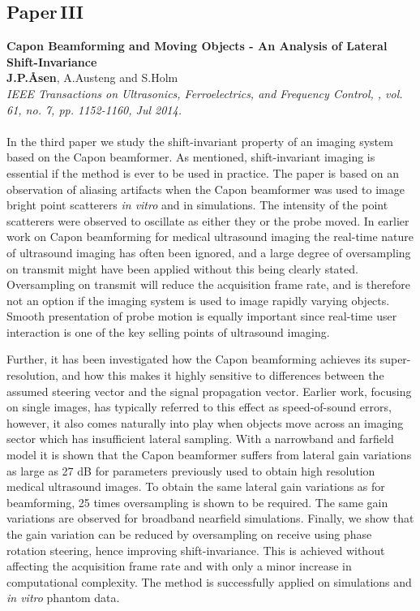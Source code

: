 \subsection{Paper\,III}
\textbf{Capon Beamforming and Moving Objects - An Analysis of Lateral Shift-Invariance}\\
\textbf{J.\:P.\:\AA{}sen}, A.\:Austeng and S.\:Holm\\
{\it IEEE Transactions on Ultrasonics, Ferroelectrics, and Frequency Control, , vol. 61, no. 7, pp. 1152-1160, Jul 2014.}\\\\
In the third paper we study the shift-invariant property of an imaging system based on the Capon beamformer. As mentioned, shift-invariant imaging is essential if the method is ever to be used in practice. The paper is based on an observation of aliasing artifacts when the Capon beamformer was used to image bright point scatterers \textit{in vitro} and in simulations. The intensity of the point scatterers were observed to oscillate as either they or the probe moved. In earlier work on Capon beamforming for medical ultrasound imaging the real-time nature of ultrasound imaging has often been ignored, and a large degree of oversampling on transmit might have been applied without this being clearly stated. Oversampling on transmit will reduce the acquisition frame rate, and is therefore not an option if the imaging system is used to image rapidly varying objects. Smooth presentation of probe motion is equally important since real-time user interaction is one of the key selling points of ultrasound imaging.

Further, it has been investigated how the Capon beamforming achieves its super-resolution, and how this makes it highly sensitive to differences between the assumed steering vector and the signal propagation vector. Earlier work, focusing on single images, has typically referred to this effect as speed-of-sound errors, however, it also comes naturally into play when objects move across an imaging sector which has insufficient lateral sampling. With a narrowband and farfield model it is shown that the Capon beamformer suffers from lateral gain variations as large as 27 dB for parameters previously used to obtain high resolution medical ultrasound images.  To obtain the same lateral gain variations as for  beamforming, 25 times oversampling is shown to be required. The same gain variations are observed for broadband nearfield simulations. Finally, we show that the gain variation can be reduced by oversampling on receive using phase rotation steering, hence improving shift-invariance. This is achieved without affecting the acquisition frame rate and with only a minor increase in computational complexity. The method is successfully applied on simulations and \textit{in vitro} phantom data.

